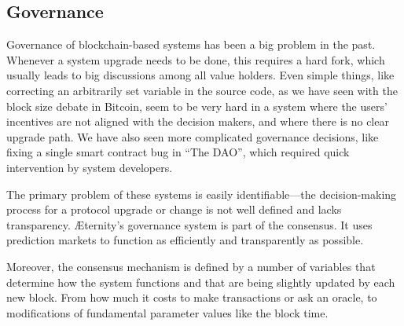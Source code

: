 \documentclass[a4paper, 10pt, conference]{ieeeconf}      %
\begin{document}
\begin{draft}
\begin{draft}
\subsection{Governance}
\label{sec:governance}
Governance of blockchain-based systems has been a big problem in the past. Whenever a system upgrade needs to be done, this requires a hard fork, which usually leads to big discussions among all value holders. %
Even simple things, like correcting an arbitrarily set variable in the source code, as we have seen with the block size debate in Bitcoin, seem to be very hard in a system where the users' incentives are not aligned with the decision makers, and where there is no clear upgrade path. We have also seen more complicated governance decisions, like fixing a single smart contract bug  in ``The DAO'', which required quick intervention by system developers.

The primary problem of these systems is easily identifiable---the decision-making process for a protocol upgrade or change is not well defined and lacks transparency. Æternity's governance system is part of the consensus. It uses %
prediction markets to function as efficiently and transparently as possible.

Moreover, the consensus mechanism is defined by a number of variables that determine how the system functions and that are being slightly updated by each new block. From how much it costs to make transactions or ask an oracle, to modifications of fundamental parameter values like the block time. %


\end{draft}
\end{draft}
\end{document}
